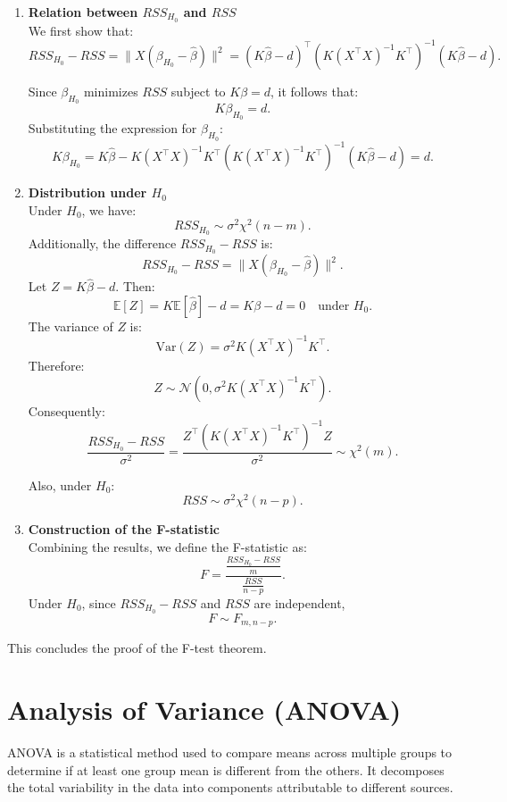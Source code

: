 \documentclass[open=any, 11pt,paper=A4]{scrreprt}
\begin{document}
\begin{enumerate}
    \item \textbf{Relation between $RSS_{H_0}$ and $RSS$} \\
    We first show that:
    \[
    RSS_{H_0} - RSS = \|X (\beta_{H_0} - \hat{\beta})\|^2 = (K \hat{\beta} - d)^\top \left(K (X^\top X)^{-1} K^\top \right)^{-1} (K \hat{\beta} - d).
    \]
    
    Since $\beta_{H_0}$ minimizes $RSS$ subject to $K \beta = d$, it follows that:
    \[
    K \beta_{H_0} = d.
    \]
    Substituting the expression for $\beta_{H_0}$:
    \[
    K \beta_{H_0} = K \hat{\beta} - K (X^\top X)^{-1} K^\top \left(K (X^\top X)^{-1} K^\top \right)^{-1} (K \hat{\beta} - d) = d.
    \]
    
    \item \textbf{Distribution under $H_0$} \\
    Under $H_0$, we have:
    \[
    RSS_{H_0} \sim \sigma^2 \chi^2(n - m).
    \]
    Additionally, the difference $RSS_{H_0} - RSS$ is:
    \[
    RSS_{H_0} - RSS = \|X (\beta_{H_0} - \hat{\beta})\|^2.
    \]
    Let $Z = K \hat{\beta} - d$. Then:
    \[
    \mathbb{E}[Z] = K \mathbb{E}[\hat{\beta}] - d = K \beta - d = 0 \quad \text{under } H_0.
    \]
    The variance of $Z$ is:
    \[
    \text{Var}(Z) = \sigma^2 K (X^\top X)^{-1} K^\top.
    \]
    Therefore:
    \[
    Z \sim \mathcal{N}(0, \sigma^2 K (X^\top X)^{-1} K^\top).
    \]
    Consequently:
    \[
    \frac{RSS_{H_0} - RSS}{\sigma^2} = \frac{Z^\top \left(K (X^\top X)^{-1} K^\top \right)^{-1} Z}{\sigma^2} \sim \chi^2(m).
    \]
    
    Also, under $H_0$:
    \[
    RSS \sim \sigma^2 \chi^2(n - p).
    \]
    
    \item \textbf{Construction of the F-statistic} \\
    Combining the results, we define the F-statistic as:
    \[
    F = \frac{\frac{RSS_{H_0} - RSS}{m}}{\frac{RSS}{n - p}}.
    \]
    Under $H_0$, since $RSS_{H_0} - RSS$ and $RSS$ are independent,
    \[
    F \sim F_{m, n - p}.
    \]
\end{enumerate}

This concludes the proof of the F-test theorem.

\section{Analysis of Variance (ANOVA)}

ANOVA is a statistical method used to compare means across multiple groups to determine if at least one group mean is different from the others. It decomposes the total variability in the data into components attributable to different sources.
\end{document}
